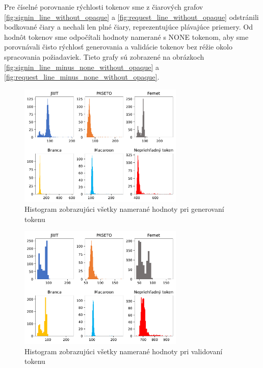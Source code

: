 Pre číselné porovnanie rýchlosti tokenov sme z čiarových grafov \ref{fig:signin_line_without_opaque} a \ref{fig:request_line_without_opaque} odstránili bodkované čiary a nechali len plné čiary, reprezentujúce plávajúce priemery. Od hodnôt tokenov sme odpočítali hodnoty namerané s NONE tokenom, aby sme porovnávali čisto rýchlosť generovania a validácie tokenov bez réžie okolo spracovania požiadaviek. Tieto grafy sú zobrazené na obrázkoch \ref{fig:signin_line_minus_none_without_opaque} a \ref{fig:request_line_minus_none_without_opaque}.

\begin{figure}[H]
  \centerline{\includegraphics[width=0.7\textwidth]{images/signin_histogram_all}}
  \caption[Histogram -- generovanie, všetky hodnoty]{Histogram zobrazujúci všetky namerané hodnoty pri generovaní tokenu}
  \label{fig:signin_histogram_all}
\end{figure}

\begin{figure}[H]
  \centerline{\includegraphics[width=0.7\textwidth]{images/request_histogram_all}}
  \caption[Histogram -- validácia, všetky hodnoty]{Histogram zobrazujúci všetky namerané hodnoty pri validovaní tokenu}
  \label{fig:request_histogram_all}
\end{figure}

